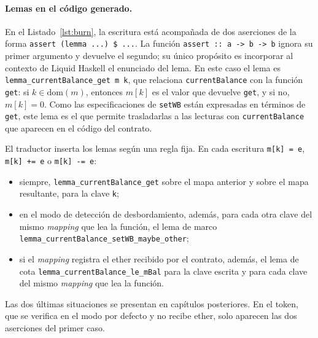 \paragraph{Lemas en el código generado.} En el Listado~\ref{lst:burn}, la escritura
está acompañada de dos aserciones de la forma
\lstinline[language=LHaskell]|assert (lemma ...) $ ...|. La función
\lstinline[language=LHaskell]|assert :: a -> b -> b| ignora su primer argumento y
devuelve el segundo; su único propósito es incorporar al contexto de Liquid Haskell el
enunciado del lema. En este caso el lema es \lstinline|lemma_currentBalance_get m k|,
que relaciona \lstinline|currentBalance| con la función \lstinline|get|: si
$k \in \mathrm{dom}(m)$, entonces $m[k]$ es el valor que devuelve \lstinline|get|, y
si no, $m[k] = 0$. Como las especificaciones de \lstinline|setWB| están expresadas en
términos de \lstinline|get|, este lema es el que permite trasladarlas a las lecturas
con \lstinline|currentBalance| que aparecen en el código del contrato.

El traductor inserta los lemas según una regla fija. En cada escritura
\lstinline|m[k] = e|, \lstinline|m[k] += e| o \lstinline|m[k] -= e|:

\begin{itemize}
  \item siempre, \lstinline|lemma_currentBalance_get| sobre el mapa anterior y sobre el
    mapa resultante, para la clave \lstinline|k|;
  \item en el modo de detección de desbordamiento, además, para cada otra clave del mismo \emph{mapping} que lea la función, el lema de
    marco \newline\lstinline|lemma_currentBalance_setWB_maybe_other|;
  \item si el \emph{mapping} registra el ether recibido por el contrato, además, el
    lema de cota \lstinline|lemma_currentBalance_le_mBal| para la clave escrita y para
    cada clave del mismo \emph{mapping} que lea la función.
\end{itemize}

\noindent Las dos últimas situaciones se presentan en capítulos posteriores. En el
token, que se verifica en el modo por defecto y no recibe ether, solo aparecen las dos
aserciones del primer caso.

